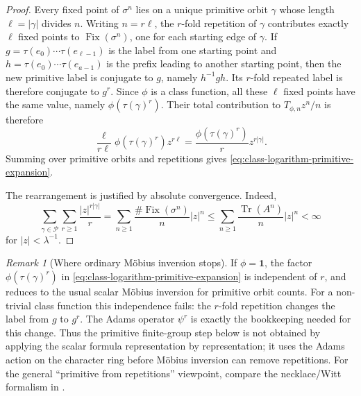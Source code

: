 \documentclass[11pt,a4paper]{amsart}
\theoremstyle{plain}
\theoremstyle{definition}
\theoremstyle{remark}
\newtheorem{remark}[theorem]{Remark}
\DeclareMathOperator{\Tr}{Tr}
\newcommand{\cP}{\mathcal P}
\begin{document}
\begin{proof}
  Every fixed point of \(\sigma^n\) lies on a unique primitive orbit
  \(\gamma\) whose length \(\ell=|\gamma|\) divides \(n\). Writing
  \(n=r\ell\), the \(r\)-fold repetition of \(\gamma\) contributes
  exactly \(\ell\) fixed points to \(\operatorname{Fix}(\sigma^n)\), one
  for each starting edge of \(\gamma\). If
  \(g=\tau(e_0)\cdots\tau(e_{\ell-1})\) is the label from one starting
  point and \(h=\tau(e_0)\cdots\tau(e_{a-1})\) is the prefix leading to
  another starting point, then the new primitive label is conjugate to
  \(g\), namely \(h^{-1}gh\). Its \(r\)-fold repeated label is therefore
  conjugate to \(g^r\). Since \(\phi\) is a class function, all these
  \(\ell\) fixed points have the same value, namely
  \(\phi(\tau(\gamma)^r)\). Their total contribution to
  \(T_{\phi,n}z^n/n\) is therefore
  \[
    \frac{\ell}{r\ell}\phi(\tau(\gamma)^r)z^{r\ell}
    =
    \frac{\phi(\tau(\gamma)^r)}{r}z^{r|\gamma|}.
  \]
  Summing over primitive orbits and repetitions gives
  \eqref{eq:class-logarithm-primitive-expansion}.

  The rearrangement is justified by absolute convergence. Indeed,
  \[
    \sum_{\gamma\in\cP}\sum_{r\ge 1}
      \frac{|z|^{r|\gamma|}}{r}
    =
    \sum_{n\ge 1}\frac{\#\operatorname{Fix}(\sigma^n)}{n}|z|^n
    \le
    \sum_{n\ge 1}\frac{\Tr(A^n)}{n}|z|^n
    <\infty
  \]
  for \(|z|<\lambda^{-1}\).
\end{proof}

\begin{remark}[Where ordinary M\"obius inversion stops]
  \label{rem:ordinary-mobius-stops}
  If \(\phi=\mathbf 1\), the factor
  \(\phi(\tau(\gamma)^r)\) in
  \eqref{eq:class-logarithm-primitive-expansion} is independent of
  \(r\), and  reduces to the
  usual scalar M\"obius inversion for primitive orbit counts. For a
  non-trivial class function this independence fails: the \(r\)-fold
  repetition changes the label from \(g\) to \(g^r\). The Adams operator
  \(\psi^r\) is exactly the bookkeeping needed for this change. Thus the
  primitive finite-group step below is not obtained by applying the
  scalar formula representation by representation; it uses the Adams
  action on the character ring before M\"obius inversion can remove
  repetitions. For the general ``primitive from repetitions'' viewpoint,
  compare the necklace/Witt formalism in
  \cite{MetropolisRota1983Necklaces,Wehrhahn1990AperiodicRings}.
\end{remark}
\end{document}
